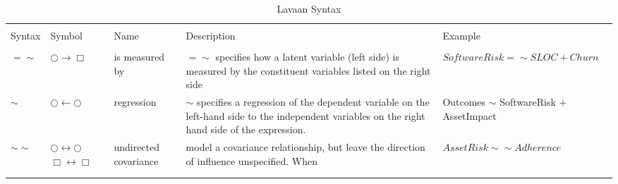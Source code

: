 \begin{table}[!htbp] \centering 
	\caption{Lavaan Syntax} 
	\label{tab:model_lavaan_syntax} 
	\begin{small}
		\begin{tabular}{p{.75cm}p{1.25cm}p{1.5cm}p{3.5cm}p{2.5cm}} 
			&&&&\\[-1.8ex]\hline 
			\hline&&&& \\[-1.8ex] 
			Syntax & Symbol & Name & Description & Example \\ 
			\hline &&&&\\[-1.8ex]  
			$=\sim$	& $\bigcirc \rightarrow \Box$ & is measured by & $=\sim$ specifies how a latent variable (left side) is measured by the constituent variables listed on the right side & $SoftwareRisk =\sim SLOC + Churn$\\	
			 $\sim$ & $\bigcirc \leftarrow \bigcirc$ & regression & $\sim$ specifies a regression of the dependent variable on the left-hand side to the independent variables on the right hand side of the expression. & Outcomes $\sim$ SoftwareRisk $+$ AssetImpact  \\	
			 $\sim\sim$ & $\bigcirc \leftrightarrow \bigcirc$ $\Box \leftrightarrow \Box$ & undirected covariance & model a covariance relationship, but leave the direction of influence unspecified. When  & $AssetRisk \sim\sim Adherence$\\
			\hline &&&&\\[-1.8ex] 
			\hline &&&&\\[-1.8ex] 
		\end{tabular} 
	\end{small}
\end{table} 


